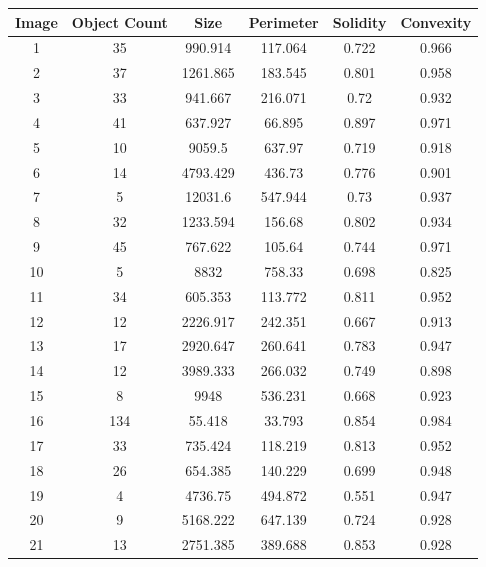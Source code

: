\documentclass{article}
\begin{document}
\begin{table}[h!]
    \centering
    \begin{tabular}{|c|c|c|c|c|c|}
    \hline
        Image  &  Object Count  &  Size  &  Perimeter  &  Solidity  &  Convexity \\ \hline
        1  &  35  &  990.914  &  117.064  &  0.722  &  0.966  \\ \hline
        2  &  37  &  1261.865  &  183.545  &  0.801  &  0.958 \\ \hline
        3  &  33  &  941.667  &  216.071  &  0.72  &  0.932 \\ \hline
        4  &  41  &  637.927  &  66.895  &  0.897  &  0.971 \\ \hline
        5  &  10  &  9059.5  &  637.97  &  0.719  &  0.918 \\ \hline
        6  &  14  &  4793.429  &  436.73  &  0.776  &  0.901 \\ \hline
        7  &  5  &  12031.6  &  547.944  &  0.73  &  0.937 \\ \hline
        8  &  32  &  1233.594  &  156.68  &  0.802  &  0.934 \\ \hline
        9  &  45  &  767.622  &  105.64  &  0.744  &  0.971 \\ \hline
        10  &  5  &  8832  &  758.33  &  0.698  &  0.825 \\ \hline
        11  &  34  &  605.353  &  113.772  &  0.811  &  0.952 \\ \hline
        12  &  12  &  2226.917  &  242.351  &  0.667  &  0.913 \\ \hline
        13  &  17  &  2920.647  &  260.641  &  0.783  &  0.947 \\ \hline
        14  &  12  &  3989.333  &  266.032  &  0.749  &  0.898 \\ \hline
        15  &  8  &  9948  &  536.231  &  0.668  &  0.923 \\ \hline
        16  &  134  &  55.418  &  33.793  &  0.854  &  0.984 \\ \hline
        17  &  33  &  735.424  &  118.219  &  0.813  &  0.952 \\ \hline
        18  &  26  &  654.385  &  140.229  &  0.699  &  0.948 \\ \hline
        19  &  4  &  4736.75  &  494.872  &  0.551  &  0.947 \\ \hline
        20  &  9  &  5168.222  &  647.139  &  0.724  &  0.928 \\ \hline
        21  &  13  &  2751.385  &  389.688  &  0.853  &  0.928 \\ \hline

\end{tabular}
\end{table}
\end{document}
